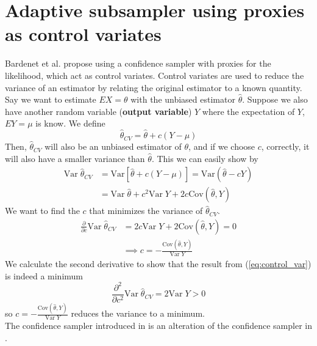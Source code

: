 {\section{Adaptive subsampler using proxies as control variates}\label{sec:adap_subsampl}
Bardenet et al. \cite{Bardenet:1} propose using a confidence sampler with proxies for the likelihood, which act as control variates. 
Control variates are used to reduce the variance of an estimator by relating the original estimator to a known quantity. 
Say we want to estimate $EX = \theta$ with the unbiased estimator $\hat{\theta}$. Suppose we also have another random variable (\textbf{output variable}) $Y$ where the expectation of $Y$, $EY = \mu$ is know. 
We define $$\hat{\theta}_{CV} = \hat{\theta} + c\left(Y - \mu\right) $$  Then, $\hat{\theta}_{CV}$ will also be  an unbiased estimator of $\theta$, and if we choose $c$, correctly, it will also have a smaller variance than $\hat{\theta}$. 
This we can easily show by \begin{equation*}
\begin{split}
    \mathrm{Var}\;\hat{\theta}_{CV}  &= \mathrm{Var}\left[\hat{\theta} + c\left(Y - \mu\right)\right]
     = \mathrm{Var}\left(\hat{\theta} - cY\right) \\ & = \mathrm{Var}\;\hat{\theta} + c^2\mathrm{Var}\;Y + 2c\mathrm{Cov}\left(\hat{\theta}, Y\right)
\end{split}
\end{equation*}
We want to find the $c$ that minimizes the variance of $\hat{\theta}_{CV}$. 
\begin{equation}\label{eq:control_var}
\begin{split}
    \frac{\partial}{\partial c} \mathrm{Var}\; \hat{\theta}_{CV} &= 2c\mathrm{Var}\;Y + 2\mathrm{Cov}\left(\hat{\theta}, Y\right) = 0 \\
    & \implies c = - \frac{\mathrm{Cov}\left(\hat{\theta}, Y\right)}{\mathrm{Var}\;Y}
\end{split}
\end{equation}
We calculate the second derivative to show that the result from (\ref{eq:control_var}) is indeed a minimum
\begin{equation*}
    \frac{\partial^2}{\partial c^2} \mathrm{Var}\; \hat{\theta}_{CV}  = 2\mathrm{Var}\; Y > 0 
\end{equation*}
so $c = -\frac{\mathrm{Cov}\left(\hat{\theta}, Y\right)}{\mathrm{Var}\;Y}$ reduces the variance to a minimum. \\
The confidence sampler introduced in \cite{Bardenet:1} is an alteration of the confidence sampler in \cite{Bardenet:2}. 
}
